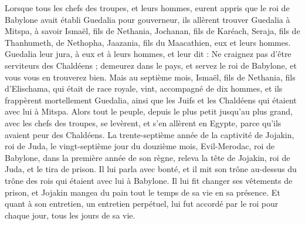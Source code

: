 \begin{multicols}{2}
Lorsque tous les chefs des troupes, et leurs hommes, eurent appris que le roi de Babylone avait établi Guedalia pour gouverneur, ils allèrent trouver Guedalia à Mitspa, à savoir Ismaël, fils de Nethania, Jochanan, fils de Karéach, Seraja, fils de Thanhumeth, de Nethopha, Jaazania, fils du Maacathien, eux et leurs hommes.
Guedalia leur jura, à eux et à leurs hommes, et leur dit : Ne craignez pas d’être serviteurs des Chaldéens ; demeurez dans le pays, et servez le roi de Babylone, et vous vous en trouverez bien.
Mais au septième mois, Ismaël, fils de Nethania, fils d’Elischama, qui était de race royale, vint, accompagné de dix hommes, et ils frappèrent mortellement Guedalia, ainsi que les Juifs et les Chaldéens qui étaient avec lui à Mitspa.
Alors tout le peuple, depuis le plus petit jusqu’au plus grand, avec les chefs des troupes, se levèrent, et s’en allèrent en Egypte, parce qu’ils avaient peur des Chaldéens.
La trente-septième année de la captivité de Jojakin, roi de Juda, le vingt-septième jour du douzième mois, Evil-Merodac, roi de Babylone, dans la première année de son règne, releva la tête de Jojakin, roi de Juda, et le tira de prison.
Il lui parla avec bonté, et il mit son trône au-dessus du trône des rois qui étaient avec lui à Babylone.
Il lui fit changer ses vêtements de prison, et Jojakin mangea du pain tout le temps de sa vie en sa présence.
Et quant à son entretien, un entretien perpétuel, lui fut accordé par le roi pour chaque jour, tous les jours de sa vie.
\PPE{}
\end{multicols}
